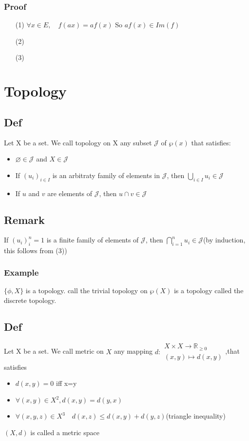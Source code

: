 \documentclass{book}
\begin{document}
\subsection{Proof}
\begin{itemize}
    \item[(1)] $\forall x\in E,\quad f(ax)=af(x)$ So $ af(x)\in Im(f)$
    \item [(2)]
    \item [(3)]
\end{itemize}
\chapter{Topology}
\section{Def}
Let X be a set. We call topology on X any subset $\mathcal{J} $ of $\wp (x)$ that satisfies:\begin{itemize}
    \item $\varnothing\in \mathcal{J} $ and $X\in \mathcal{J} $
    \item If $(u_i)_{i\in I}$ is an arbitraty family of elements in $\mathcal{J} $, then $\bigcup\limits_{i\in I}u_i\in \mathcal{J} $
    \item If $u$ and $v$ are elements of $\mathcal{J} $, then $u\cap v\in \mathcal{J} $
\end{itemize}
\section{Remark}
If $(u_i)^n_i=1$ is a finite family of elements of $\mathcal{J} $, then $\bigcap\limits_{i=1}^{n}u_i\in \mathcal{J}$(by induction, this follows from (3))
\subsection{Example}
$\{\phi,X\}$ is a topology. call the trivial topology on $\wp (X)$ is a topology called the discrete topology.
\section{Def}
Let X be a set. We call metric on $X$ any mapping $d:\begin{aligned}
    X\times X\rightarrow\mathbb{R} _{\geq 0}\\(x,y)\mapsto d(x,y)
\end{aligned}$,that satisfies\begin{itemize}
    \item $d(x,y)=0$ iff x=y
    \item $\forall(x,y)\in X^2, d(x,y)=d(y,x)$
    \item $\forall(x,y,z)\in X^3\quad d(x,z)\leq d(x,y)+d(y,z)$(triangle inequality)
\end{itemize}
$(X,d)$ is called a metric space
\end{document}
